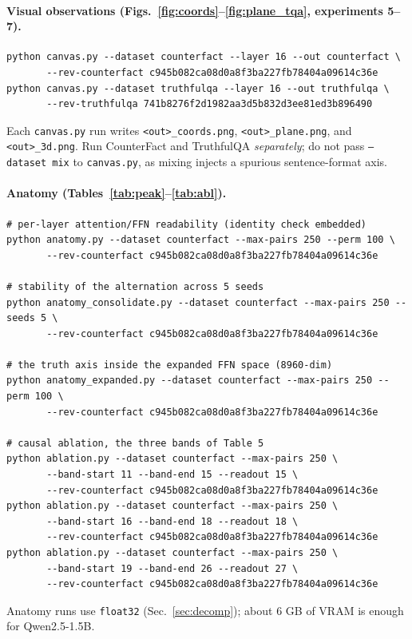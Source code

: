 \documentclass[11pt]{article}
\begin{document}
\paragraph{Visual observations (Figs.~\ref{fig:coords}--\ref{fig:plane_tqa}, experiments 5--7).}
\begin{verbatim}
python canvas.py --dataset counterfact --layer 16 --out counterfact \
       --rev-counterfact c945b082ca08d0a8f3ba227fb78404a09614c36e
python canvas.py --dataset truthfulqa --layer 16 --out truthfulqa \
       --rev-truthfulqa 741b8276f2d1982aa3d5b832d3ee81ed3b896490
\end{verbatim}
Each \texttt{canvas.py} run writes \texttt{<out>\_coords.png},
\texttt{<out>\_plane.png}, and \texttt{<out>\_3d.png}. Run CounterFact and
TruthfulQA \emph{separately}; do not pass \texttt{--dataset mix} to
\texttt{canvas.py}, as mixing injects a spurious sentence-format axis.

\paragraph{Anatomy (Tables~\ref{tab:peak}--\ref{tab:abl}).}
\begin{verbatim}
# per-layer attention/FFN readability (identity check embedded)
python anatomy.py --dataset counterfact --max-pairs 250 --perm 100 \
       --rev-counterfact c945b082ca08d0a8f3ba227fb78404a09614c36e

# stability of the alternation across 5 seeds
python anatomy_consolidate.py --dataset counterfact --max-pairs 250 --seeds 5 \
       --rev-counterfact c945b082ca08d0a8f3ba227fb78404a09614c36e

# the truth axis inside the expanded FFN space (8960-dim)
python anatomy_expanded.py --dataset counterfact --max-pairs 250 --perm 100 \
       --rev-counterfact c945b082ca08d0a8f3ba227fb78404a09614c36e

# causal ablation, the three bands of Table 5
python ablation.py --dataset counterfact --max-pairs 250 \
       --band-start 11 --band-end 15 --readout 15 \
       --rev-counterfact c945b082ca08d0a8f3ba227fb78404a09614c36e
python ablation.py --dataset counterfact --max-pairs 250 \
       --band-start 16 --band-end 18 --readout 18 \
       --rev-counterfact c945b082ca08d0a8f3ba227fb78404a09614c36e
python ablation.py --dataset counterfact --max-pairs 250 \
       --band-start 19 --band-end 26 --readout 27 \
       --rev-counterfact c945b082ca08d0a8f3ba227fb78404a09614c36e
\end{verbatim}
Anatomy runs use \texttt{float32} (Sec.~\ref{sec:decomp}); about $6$ GB of
VRAM is enough for Qwen2.5-1.5B.
\end{document}

